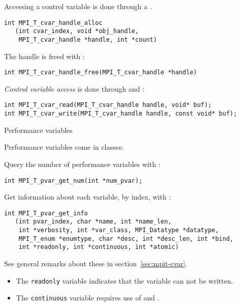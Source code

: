 Accessing a control variable is done through a
.
\begin{lstlisting}
int MPI_T_cvar_handle_alloc
   (int cvar_index, void *obj_handle,
    MPI_T_cvar_handle *handle, int *count)
\end{lstlisting}
The handle is freed with :
\begin{lstlisting}
int MPI_T_cvar_handle_free(MPI_T_cvar_handle *handle)
\end{lstlisting}

\emph{Control variable access}
is done through  and :
\begin{lstlisting}
int MPI_T_cvar_read(MPI_T_cvar_handle handle, void* buf);
int MPI_T_cvar_write(MPI_T_cvar_handle handle, const void* buf);
\end{lstlisting}


 {Performance variables}

\begin{raggedlist}
  Performance variables come in classes:
\end{raggedlist}

Query the number of performance variables with :
\begin{lstlisting}
int MPI_T_pvar_get_num(int *num_pvar);
\end{lstlisting}
Get information about each variable, by index, with :
\begin{lstlisting}
int MPI_T_pvar_get_info
   (int pvar_index, char *name, int *name_len,
    int *verbosity, int *var_class, MPI_Datatype *datatype,
    MPI_T_enum *enumtype, char *desc, int *desc_len, int *bind,
    int *readonly, int *continuous, int *atomic)
\end{lstlisting}
See general remarks about these in section~\ref{sec:mpit-cvar}.
\begin{itemize}
\item The \lstinline{readonly} variable indicates that the variable can not be written.
\item The \lstinline{continuous} variable requires use of
   and .
\end{itemize}

